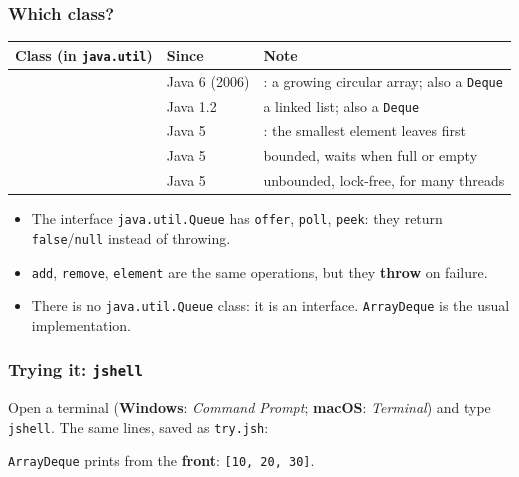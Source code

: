 \documentclass[aspectratio=169,10pt,compress]{beamer}
\newcommand{\win}{\textbf{Windows}}
\newcommand{\mac}{\textbf{macOS}}
\begin{document}
\begin{frame}[t,fragile] \frametitle{Which class?}
  \begin{center}\footnotesize
  \begin{tabular}{@{}lL{0.16\textwidth}L{0.44\textwidth}@{}}
    \toprule
    \textbf{Class (in \texttt{java.util})} & \textbf{Since} & \textbf{Note} \\
    \midrule
               & Java 6 (2006) & : a growing circular array; also a \texttt{Deque} \\
               & Java 1.2      & a linked list; also a \texttt{Deque} \\
            & Java 5        & : the smallest element leaves first \\
       & Java 5        & bounded, waits when full or empty \\
    & Java 5        & unbounded, lock-free, for many threads \\
    \bottomrule
  \end{tabular}
  \end{center}
  \vspace{0.3em}
  \begin{itemize}\small
    \item The interface \texttt{java.util.Queue} has \texttt{offer}, \texttt{poll}, \texttt{peek}: they return \texttt{false}/\texttt{null} instead of throwing.
    \item \texttt{add}, \texttt{remove}, \texttt{element} are the same operations, but they \textbf{throw} on failure.
    \item There is no \texttt{java.util.Queue} class: it is an interface. \texttt{ArrayDeque} is the usual implementation.
  \end{itemize}
\end{frame}




\begin{frame}[t,fragile] \frametitle{Trying it: \texttt{jshell}}
  \small Open a terminal (\win: \emph{Command Prompt}; \mac: \emph{Terminal}) and type \texttt{jshell}.
  The same lines, saved as \texttt{try.jsh}:


  \vspace{0.1em}
  \small \texttt{ArrayDeque} prints from the \textbf{front}: \texttt{[10, 20, 30]}.
\end{frame}
\end{document}
